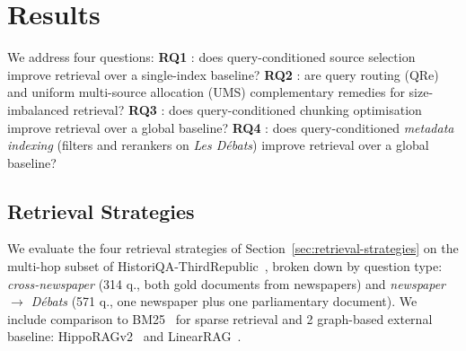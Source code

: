 

\section{Results}
\label{sec:results}

We address four questions:
\textbf{RQ1} : does query-conditioned source selection improve retrieval over a single-index baseline?
\textbf{RQ2} : are query routing (QRe) and uniform multi-source allocation (UMS) complementary remedies for size-imbalanced retrieval?
\textbf{RQ3} : does query-conditioned chunking optimisation improve retrieval over a global baseline?
\textbf{RQ4} : does query-conditioned \emph{metadata indexing} (filters and rerankers on \textit{Les Débats}) improve retrieval over a global baseline?

\subsection{Retrieval Strategies}
\label{sec:retrieval-results}

We evaluate the four retrieval strategies of
Section~\ref{sec:retrieval-strategies} on the multi-hop subset of
HistoriQA-ThirdRepublic~\cite{historiqa-pellet}, broken down by question type:
\textit{cross-newspaper} (314 q., both gold documents from newspapers) and
\textit{newspaper $\rightarrow$ Débats} (571 q., one newspaper plus one
parliamentary document). We include comparison to BM25~\cite{bm25} for sparse retrieval and 2 graph-based external baseline: HippoRAGv2~\cite{hipporagv2} and LinearRAG~\cite{linearrag_2025}.


